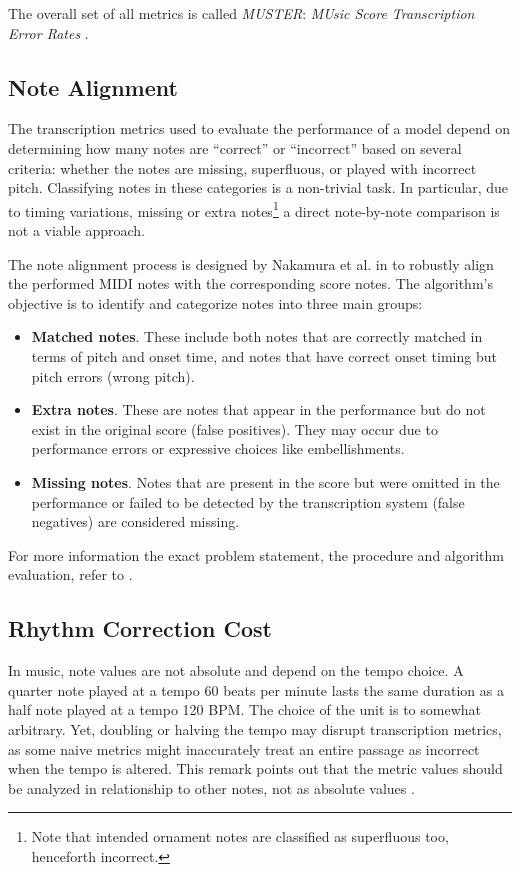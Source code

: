 The overall set of all metrics is called \emph{MUSTER}: \emph{MUsic Score Transcription Error Rates} \cite{Hiramatsu2021}.

\subsection{Note Alignment}

The transcription metrics used to evaluate the performance of a model depend on determining how many notes are ``correct'' or ``incorrect'' based on several criteria: whether the notes are missing, superfluous, or played with incorrect pitch. Classifying notes in these categories is a non-trivial task. In particular, due to timing variations, missing or extra notes\footnote{Note that intended ornament notes are classified as superfluous too, henceforth incorrect.} a direct note-by-note comparison is not a viable approach.

The note alignment process is designed by Nakamura et al. in \cite{Nakamura2017b} to robustly align the performed MIDI notes with the corresponding score notes. The algorithm's objective is to identify and categorize notes into three main groups: \begin{itemize}
	\item {\bf Matched notes}. These include both notes that are correctly matched in terms of pitch and onset time, and notes that have correct onset timing but pitch errors (wrong pitch).
	\item {\bf Extra notes}. These are notes that appear in the performance but do not exist in the original score (false positives). They may occur due to performance errors or expressive choices like embellishments.
	\item {\bf Missing notes}. Notes that are present in the score but were omitted in the performance or failed to be detected by the transcription system (false negatives) are considered missing.
\end{itemize}

For more information the exact problem statement, the procedure and algorithm evaluation, refer to \cite{Nakamura2017b}.

\subsection{Rhythm Correction Cost}

In music, note values are not absolute and depend on the tempo choice. A quarter note played at a tempo $60$ beats per minute lasts the same duration as a half note played at a tempo 120 BPM. The choice of the unit is to somewhat arbitrary. Yet, doubling or halving the tempo may disrupt transcription metrics, as some naive metrics might inaccurately treat an entire passage as incorrect when the tempo is altered. This remark points out that the metric values should be analyzed in relationship to other notes, not as absolute values \cite[p. 7]{Nakamura2017c}.

